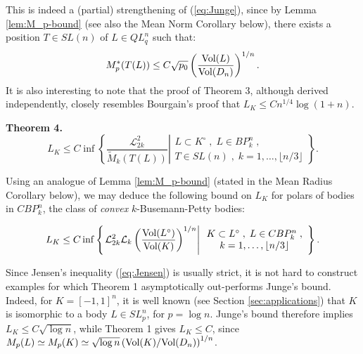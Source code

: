 \documentclass[12pt,oneside]{amsart}
\theoremstyle{definition}
\theoremstyle{remark}
\theoremstyle{proof}
\numberwithin{equation}{section}
\newcommand{\set}[1]{\left\{#1\right\}}
\newcommand{\brac}[1]{\left(#1\right)}
\newcommand{\BP}{BP}
\renewcommand{\MR}{\widetilde{M}} %
\renewcommand{\L}{\mathcal{L}}
\newcommand{\Lk}{\mathcal{L}_k}
\newcommand{\Vol}[1]{\textnormal{Vol} (#1)}
\newcommand{\sVolRatio}[2]{\brac{\Vol{#1}/\Vol{#2}}^{1/n}}
\newcommand{\VolRatio}[2]{\brac{\frac{\Vol{#1}}{\Vol{#2}}}^{1/n}}
\begin{document}
\medskip
\noindent This is indeed a (partial) strengthening of
(\ref{eq:Junge}), since by Lemma \ref{lem:M_p-bound} (see also
the Mean Norm Corollary below), there exists a position $T \in
SL(n)$ of $L\in QL_q^n$ such that:
\[
M^*_p(T(L)) \leq C \sqrt{p_0} \VolRatio{L}{D_n}.
\]
It is also interesting to note that the proof of Theorem 3,
although derived independently, closely resembles Bourgain's
proof that $L_K \leq C n^{1/4} \log(1+n)$.

\medskip
\smallskip
\noindent\textbf{Theorem 4.}
\smallskip
\[
L_K \leq C \inf \set{\left . \frac{\L_{2k}^2}{\MR_k(T(L))}  \right
|
\begin{array}{c} L \subset K^\circ \; , \; L \in \BP_k^n \; , \\ T \in SL(n) \; , \; k =
1,\ldots,\lfloor n/3 \rfloor \end{array} }.
\]

\noindent Using an analogue of Lemma \ref{lem:M_p-bound} (stated
in the Mean Radius Corollary below), we may deduce the following
bound on $L_K$ for polars of bodies in $C\BP_k^n$, the class of
\emph{convex} $k$-Busemann-Petty bodies:

\[
L_K \leq C \inf \set{\left . \L_{2k}^2 \Lk \VolRatio{L^\circ}{K}
\right | \begin{array}{c} K \subset L^\circ \; , \; L \in
C\BP_k^n \; , \\ k = 1,\ldots,\lfloor n/3 \rfloor \end{array} }.
\]

\medskip

Since Jensen's inequality (\ref{eq:Jensen}) is usually strict, it
is not hard to construct examples for which Theorem 1
asymptotically out-performs Junge's bound. Indeed, for $K =
[-1,1]^n$, it is well known (see Section \ref{sec:applications})
that $K$ is isomorphic to a body $L \in SL_p^n$, for $p = \log
n$. Junge's bound therefore implies $L_K \leq C \sqrt{\log n}$,
while Theorem 1 gives $L_K \leq C$, since $M_p(L) \simeq M_p(K)
\simeq \sqrt{\log n} \sVolRatio{K}{D_n}$.

\smallskip
\end{document}
